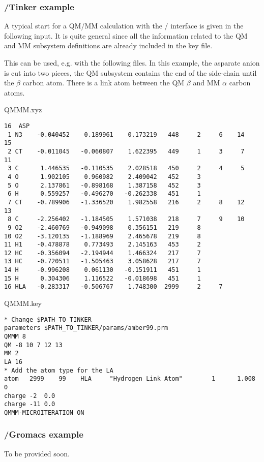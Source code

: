 \subsubsection{\molcas/Tinker example}
A typical start for a QM/MM calculation with the \molcas/ interface is given in the following input. It is quite general since all the information related to the QM and MM subsystem definitions are already included in the  key file.


This can be used, e.g. with the following  files. In this example, the asparate anion is cut into two pieces, the QM subsystem contains the end of the side-chain until the $\beta$ carbon atom. There is a link atom between the QM $\beta$ and MM $\alpha$ carbon atoms.

QMMM.xyz
\begin{verbatim}
16  ASP
 1 N3    -0.040452    0.189961    0.173219   448     2     6    14    15
 2 CT    -0.011045   -0.060807    1.622395   449     1     3     7    11
 3 C      1.446535   -0.110535    2.028518   450     2     4     5
 4 O      1.902105    0.960982    2.409042   452     3
 5 O      2.137861   -0.898168    1.387158   452     3
 6 H      0.559257   -0.496270   -0.262338   451     1
 7 CT    -0.789906   -1.336520    1.982558   216     2     8    12    13
 8 C     -2.256402   -1.184505    1.571038   218     7     9    10
 9 O2    -2.460769   -0.949098    0.356151   219     8
10 O2    -3.120135   -1.188969    2.465678   219     8
11 H1    -0.478878    0.773493    2.145163   453     2
12 HC    -0.356094   -2.194944    1.466324   217     7
13 HC    -0.720511   -1.505463    3.058628   217     7
14 H     -0.996208    0.061130   -0.151911   451     1
15 H      0.304306    1.116522   -0.018698   451     1
16 HLA   -0.283317   -0.506767    1.748300  2999     2     7
\end{verbatim}

QMMM.key
\begin{verbatim}
* Change $PATH_TO_TINKER
parameters $PATH_TO_TINKER/params/amber99.prm
QMMM 8
QM -8 10 7 12 13
MM 2
LA 16
* Add the atom type for the LA
atom   2999    99    HLA     "Hydrogen Link Atom"        1      1.008     0
charge -2  0.0
charge -11 0.0
QMMM-MICROITERATION ON
\end{verbatim}

\subsubsection{\molcas/Gromacs example}
To be provided soon.

